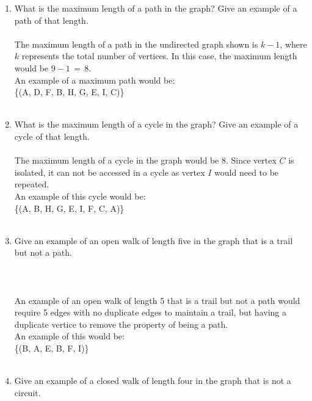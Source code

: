 \documentclass{amsart}
\theoremstyle{definition}
\theoremstyle{Exercise}
\theoremstyle{remark}
\theoremstyle{rule}
\numberwithin{equation}{section}
\begin{document}
    \begin{enumerate}[label=(\roman*)]
        \item What is the maximum length of a path in the graph? Give an example of a path of that length.\\\\
           The maximum length of a path in the undirected graph shown is $k-1$, where $k$ represents the total number of vertices. In this
           case, the maximum length would be $9-1\,=\, 8$.\\
           An example of a maximum path would be:\\
           \{(A, D, F, B, H, G, E, I, C)\}
\\\\
        \item What is the maximum length of a cycle in the graph? Give an example of a cycle of that length.\\\\
           The maximum length of a cycle in the graph would be 8. Since vertex $C$ is isolated, it can not be accessed in a cycle as
           vertex $I$ would need to be repeated.\\
           An example of this cycle would be:\\
           \{(A, B, H, G, E, I, F, C, A)\}
\\\\
        \item Give an example of an open walk of length five in the graph that is a trail but not a path.\\\\
        \vspace*{0.1in}
        \\\\
           An example of an open walk of length 5 that is a trail but not a path would require 5 edges with no duplicate edges to maintain
           a trail, but having a duplicate vertice to remove the property of being a path.\\
           An example of this would be:\\
           \{(B, A, E, B, F, I)\}
\\\\
        \item Give an example of a closed walk of length four in the graph that is not a circuit.\\\\

\end{enumerate}
\end{document}
